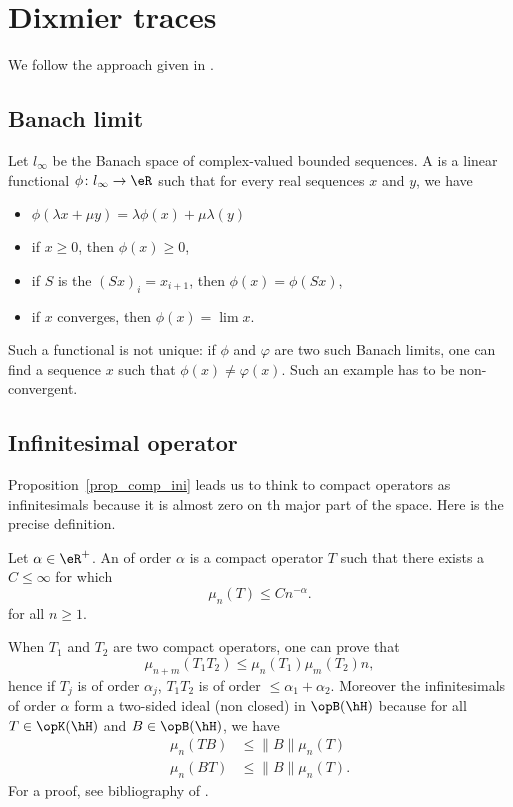 %
   \section{Dixmier traces}
%

We follow the approach given in \cite{Landi,itoNCG_Varilly}.

\subsection{Banach limit}

Let $l_{\infty}$ be the Banach space of complex-valued bounded sequences. A  is a linear functional $\phi\colon l_{\infty}\to \eR$ such that for every real sequences $x$ and $y$, we have
\begin{itemize}
\item $\phi(\lambda x+\mu y)=\lambda\phi(x)+\mu\lambda(y)$
\item if $x\geq 0$, then $\phi(x)\geq 0$,
\item if $S$ is the  $(Sx)_i=x_{i+1}$, then $\phi(x)=\phi(Sx)$,
\item if $x$ converges, then $\phi(x)=\lim x$.
\end{itemize}
Such a functional is not unique: if $\phi$ and $\varphi$ are two such Banach limits, one can find a sequence $x$ such that $\phi(x)\neq\varphi(x)$. Such an example has to be non-convergent.

\subsection{Infinitesimal operator}

Proposition~\ref{prop_comp_ini} leads us to think to compact operators as infinitesimals because it is almost zero on th major part of the space. Here is the precise definition.

\begin{definition}
Let $\alpha\in\eR^+$. An  of order $\alpha$ is a compact operator $T$ such that there exists a $C\leq\infty$ for which
\[
  \mu_n(T)\leq Cn^{-\alpha}.
\]
for all $n\geq 1$.
\end{definition}

When $T_1$ and $T_2$ are two compact operators, one can prove that
\[
  \mu_{n+m}(T_1T_2)\leq\mu_n(T_1)\mu_m(T_2)n,
\]
hence if $T_j$ is of order $\alpha_j$, $T_1T_2$ is of order $\leq\alpha_1+\alpha_2$. Moreover the infinitesimals of order $\alpha$ form a two-sided ideal (non closed) in $\opB(\hH)$ because for all $T\in\opK(\hH)$ and $B\in\opB(\hH)$, we have
\begin{equation}
\begin{split}
\mu_n(TB)&\leq\| B \|\mu_n(T)\\
\mu_n(BT)&\leq\| B \|\mu_n(T).
\end{split}
\end{equation}
For a proof, see bibliography of \cite{Landi}.

